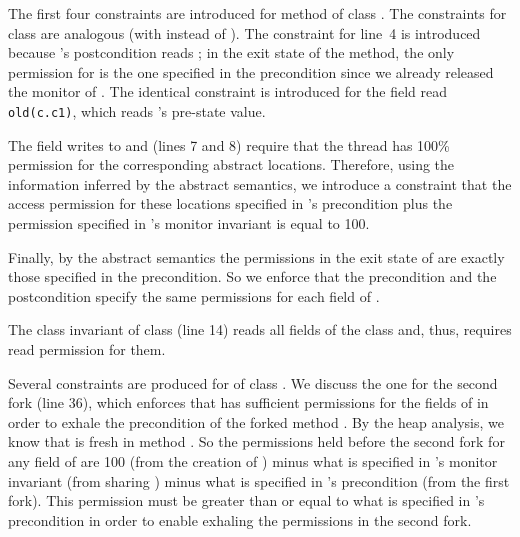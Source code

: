 \documentclass{llncs}
\begin{document}
\lstset{basicstyle=\sffamily\normalsize}
The first four constraints are introduced for method 
of class . The constraints for class  are
analogous (with  instead of ).
The constraint for line~4 is introduced because 's
postcondition reads ; in the exit state of the method,
the only permission for  is the one specified in the
precondition since we already released the monitor of .
The identical constraint is introduced for the field read
\lstinline{old(c.c1)}, which reads 's pre-state value.

The field writes to  and  (lines 7
and 8) require that the thread has 100\% permission
for the corresponding abstract locations. Therefore, using the
information inferred by the abstract semantics, we introduce a
constraint that the access permission for these locations specified in
's precondition plus the permission specified in
's monitor invariant is equal to 100.

Finally, by the abstract semantics the permissions in the exit state
of  are exactly those specified in the precondition.
So we enforce that the precondition and the postcondition specify the
same permissions for each field  of .

The class invariant of class  (line 14) reads all
fields of the class and, thus, requires read permission for them.


Several constraints are produced for  of class
. We discuss the one for the second fork (line
36), which enforces that  has sufficient
permissions for the fields of  in order to exhale the
precondition of the forked method . By the heap
analysis, we know that  is fresh in method
. So the permissions held before the second fork for
any field  of  are 100 (from the creation of
) minus what is specified in 's monitor
invariant (from sharing ) minus what is specified in
's precondition (from the first fork). This
permission must be greater than or equal to what is specified in
's precondition in order to enable exhaling the
permissions in the second fork.
\end{document}
